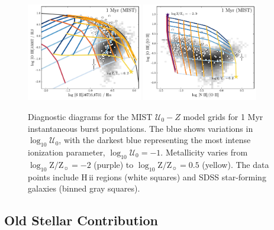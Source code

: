 \documentclass[twocolumn, tighten]{aastex61}
\newcommand{\logten}{\ensuremath{\log_{10}}}
\newcommand{\hii}{H\,{\sc ii}\xspace}
\newcommand{\logZeq}[1]{\ensuremath{\logten \mathrm{Z}/\mathrm{Z}_{\sun} = #1}}
\newcommand{\U}{\ensuremath{\mathcal{U}_{0}}}
\newcommand{\logU}{\ensuremath{\logten \mathcal{U}_0}}
\begin{document}
\begin{figure}
  \begin{centering}
    \includegraphics[width=0.45\textwidth]{f24a.pdf}
    \includegraphics[width=0.45\textwidth]{f24b.pdf}
    \caption{Diagnostic diagrams for the MIST $\U-Z$ model grids for 1 Myr instantaneous burst populations. The blue shows variations in \logU{}, with the darkest blue representing the most intense ionization parameter, $\logU{}=-1$. Metallicity varies from \logZeq{-2} (purple) to \logZeq{0.5} (yellow). The data points include \hii regions (white squares) and SDSS star-forming galaxies (binned gray squares).}
    \label{fig:MIST:altRatios}
  \end{centering}
\end{figure}



\subsection{Old Stellar Contribution}\label{sec:secondary:old}
\end{document}
